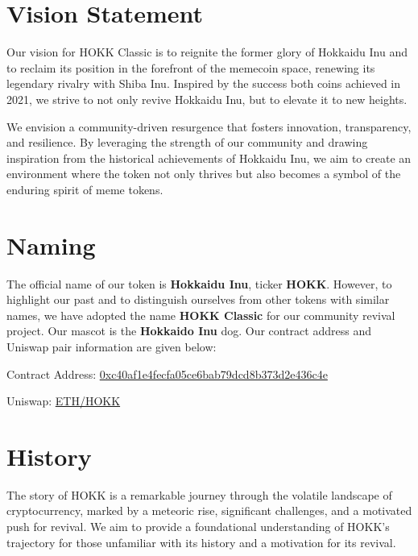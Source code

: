 \documentclass{article}
\begin{document}
\section{Vision Statement}
Our vision for HOKK Classic is to reignite the former glory of Hokkaidu Inu and to reclaim its position in the forefront of the memecoin space, renewing its legendary rivalry with Shiba Inu. Inspired by the success both coins achieved in 2021, we strive to not only revive Hokkaidu Inu, but to elevate it to new heights.

We envision a community-driven resurgence that fosters innovation, transparency, and resilience. By leveraging the strength of our community and drawing inspiration from the historical achievements of Hokkaidu Inu, we aim to create an environment where the token not only thrives but also becomes a symbol of the enduring spirit of meme tokens.

\section{Naming}
The official name of our token is \textbf{Hokkaidu Inu}, ticker \textbf{HOKK}. However, to highlight our past and to distinguish ourselves from other tokens with similar names, we have adopted the name \textbf{HOKK Classic} for our community revival project. Our mascot is the \textbf{Hokkaido Inu} dog. Our contract address and Uniswap pair information are given below:

\bigskip
{\raggedleft Contract Address: \href{https://etherscan.io/token/0xc40af1e4fecfa05ce6bab79dcd8b373d2e436c4e}{0xc40af1e4fecfa05ce6bab79dcd8b373d2e436c4e}}

\smallskip
{\raggedleft Uniswap: \href{https://v2.info.uniswap.org/pair/0x9314941c11d6dee1d7bf93113eb74d4718949f3b}{ETH/HOKK}}

\vfill
\tableofcontents

\newpage
\section{History}
The story of HOKK is a remarkable journey through the volatile landscape of cryptocurrency, marked by a meteoric rise, significant challenges, and a motivated push for revival. We aim to provide a foundational understanding of HOKK's trajectory for those unfamiliar with its history and a motivation for its revival.
\end{document}
